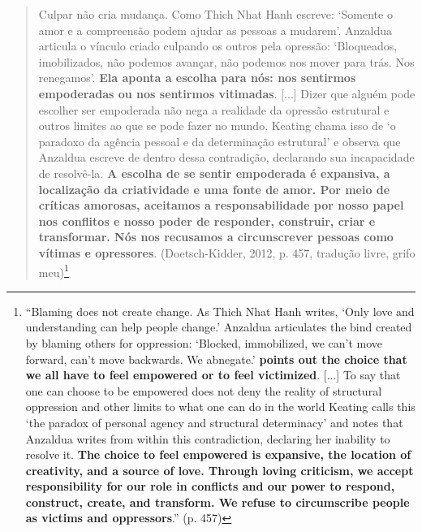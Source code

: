 \begin{quote}
    Culpar não cria mudança. Como Thich Nhat Hanh escreve: ‘Somente o amor e a compreensão podem ajudar as pessoas a mudarem’. Anzaldua articula o vínculo criado culpando os outros pela opressão: ‘Bloqueados, imobilizados, não podemos avançar, não podemos nos mover para trás. Nos renegamos’. \textbf{Ela aponta a escolha para nós: nos sentirmos empoderadas ou nos sentirmos vitimadas}. [...] Dizer que alguém pode escolher ser empoderada não nega a realidade da opressão estrutural e outros limites ao que se pode fazer no mundo. Keating chama isso de ‘o paradoxo da agência pessoal e da determinação estrutural’ e observa que Anzaldua escreve de dentro dessa contradição, declarando sua incapacidade de resolvê-la. \textbf{A escolha de se sentir empoderada é expansiva, a localização da criatividade e uma fonte de amor. Por meio de críticas amorosas, aceitamos a responsabilidade por nosso papel nos conflitos e nosso poder de responder, construir, criar e transformar. Nós nos recusamos a circunscrever pessoas como vítimas e opressores}. (Doetsch-Kidder, 2012, p. 457, tradução livre, grifo meu)\footnote{``Blaming does not create change. As Thich Nhat Hanh writes, ‘Only love and understanding can help people change.’ Anzaldua articulates the bind created by blaming others for oppression: ‘Blocked, immobilized, we can't move forward, can't move backwards. We abnegate.’ \textbf{points out the choice that we all have to feel empowered or to feel victimized}. [...] To say that one can choose to be empowered does not deny the reality of structural oppression and other limits to what one can do in the world Keating calls this ‘the paradox of personal agency and structural determinacy’ and notes that Anzaldua writes from within this contradiction, declaring her inability to resolve it. \textbf{The choice to feel empowered is expansive, the location of creativity, and a source of love. Through loving criticism, we accept responsibility for our role in conflicts and our power to respond, construct, create, and transform. We refuse to circumscribe people as victims and oppressors}.'' (p. 457)}
\end{quote}

